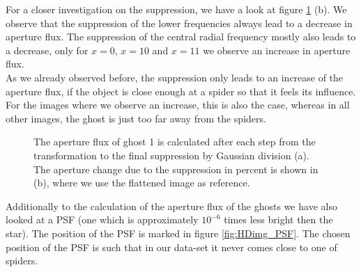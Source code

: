 For a closer investigation on the suppression, we have a look at figure \ref{fig:Ghost1_apertures} (b). We observe that the suppression of the lower frequencies always lead to a decrease in aperture flux. The suppression of the central radial frequency mostly also leads to a decrease, only for $x=0$, $x=10$ and $x=11$ we observe an increase in aperture flux.\\
As we already observed before, the suppression only leads to an increase of the aperture flux, if the object is close enough at a spider so that it feels its influence. For the images where we observe an increase, this is also the case, whereas in all other images, the ghost is just too far away from the spiders.\\
\begin{figure}[H]
	\centering
\caption{The aperture flux of ghost 1 is calculated after each step from the transformation to the final suppression by Gaussian division (a). The aperture change due to the suppression in percent is shown in (b), where we use the flattened image as reference.}
\label{fig:Ghost1_apertures}
\end{figure}
Additionally to the calculation of the aperture flux of the ghosts we have also looked at a PSF (one which is approximately $10^{-6}$ times less bright then the star). The position of the PSF is marked in figure \ref{fig:HDimg_PSF}. The chosen position of the PSF is such that in our data-set it never comes close to one of spiders. 
